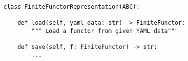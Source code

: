 \begin{verbatim}
class FiniteFunctorRepresentation(ABC):

    def load(self, yaml_data: str) -> FiniteFunctor:
        """ Load a functor from given YAML data"""

    def save(self, f: FiniteFunctor) -> str:
        ...
\end{verbatim}